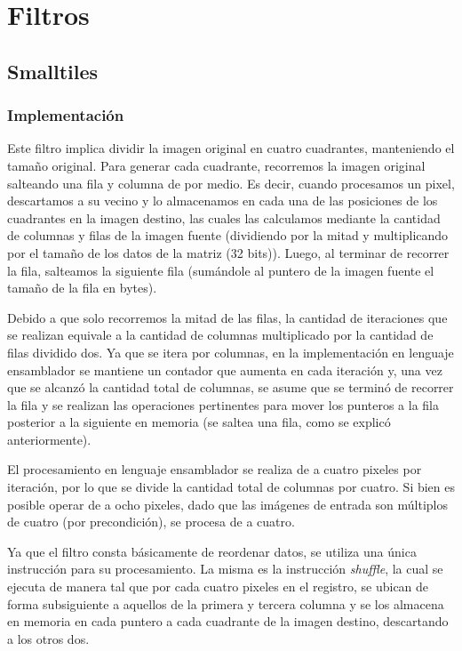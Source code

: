 \documentclass[a4paper]{article}
\begin{document}
\section{Filtros} 
\subsection{Smalltiles}
\subsubsection{Implementación}
Este filtro implica dividir la imagen original en cuatro cuadrantes, manteniendo el tamaño original. Para generar cada cuadrante, recorremos la imagen original salteando una fila y columna de por medio. Es decir, cuando procesamos un pixel, descartamos a su vecino y lo almacenamos en cada una de las posiciones de los cuadrantes en la imagen destino, las cuales las calculamos mediante la cantidad de columnas y filas de la imagen fuente (dividiendo por la mitad y multiplicando por el tamaño de los datos de la matriz (32 bits)). Luego, al terminar de recorrer la fila, salteamos la siguiente fila (sumándole al puntero de la imagen fuente el tamaño de la fila en bytes).

Debido a que solo recorremos la mitad de las filas, la cantidad de iteraciones que se realizan equivale a la cantidad de columnas multiplicado por la cantidad de filas dividido dos. Ya que se itera por columnas, en la implementación en lenguaje ensamblador se mantiene un contador que aumenta en cada iteración y, una vez que se alcanzó la cantidad total de columnas, se asume que se terminó de recorrer la fila y se realizan las operaciones pertinentes para mover los punteros a la fila posterior a la siguiente en memoria (se saltea una fila, como se explicó anteriormente).
\bigskip

El procesamiento en lenguaje ensamblador se realiza de a cuatro pixeles por iteración, por lo que se divide la cantidad total de columnas por cuatro. Si bien es posible operar de a ocho pixeles, dado que las imágenes de entrada son múltiplos de cuatro (por precondición), se procesa de a cuatro.

Ya que el filtro consta básicamente de reordenar datos, se utiliza una única instrucción para su procesamiento. La misma es la instrucción \textit{shuffle}, la cual se ejecuta de manera tal que por cada cuatro pixeles en el registro, se ubican de forma subsiguiente a aquellos de la primera y tercera columna y se los almacena en memoria en cada puntero a cada cuadrante de la imagen destino, descartando a los otros dos.
\bigskip
\end{document}
